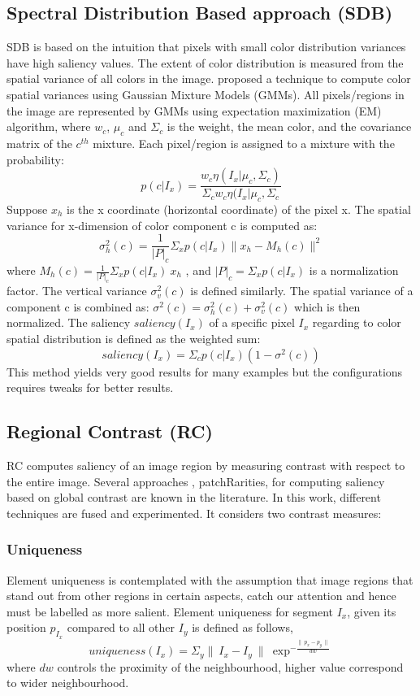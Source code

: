 \subsection{Spectral Distribution Based approach (SDB)} 
SDB is based on the intuition that pixels with small color distribution variances have high saliency values.  The extent of color distribution is measured from the spatial variance of all colors in the image.  \cite{spectralSal} proposed a technique to compute color spatial variances using Gaussian Mixture Models (GMMs).  All pixels/regions in the image are represented by GMMs using expectation maximization (EM) algorithm, where $w_{c}$, $\mu_{c}$ and $\Sigma_{c}$ is the weight, the mean color, and the covariance matrix of the $c^{th}$ mixture. Each pixel/region is assigned to a mixture with the probability:
$$p(c | I_{x}) = \frac{w_{c}\eta(I_{x}| \mu_{c},\Sigma_{c})}{\Sigma_{c}w_{c}\eta(I_{x}| \mu_{c},\Sigma_{c}} $$
Suppose $x_{h}$ is the x coordinate (horizontal coordinate) of the pixel x. The spatial variance for x-dimension of color component c is computed as:
$$\sigma_{h}^{2}(c) = \frac{1}{|P|_{c}}\Sigma_{x}	p(c | I_{x}) \parallel x_{h} -M_{h}(c) \parallel^{2}$$
where $M_{h}(c) = \frac{1}{|P|_{c}}\Sigma_{x}p(c|I_{x})~x_h$ , and $|P|_{c} = \Sigma_{x}p(c | I_{x})$ is a normalization factor.  The vertical variance $\sigma_{v}^{2}(c)$ is defined similarly.  The spatial variance of a component c is combined as: $\sigma^{2}(c) = \sigma_{h}^{2}(c) + \sigma_{v}^{2}(c)$ which is then normalized.
The saliency $saliency(I_{x})$ of a specific pixel $I_{x}$ regarding to color spatial distribution is defined as the weighted sum:
$$saliency(I_{x}) = \Sigma_{c}p(c | I_{x})(1-\sigma^{2}(c))$$
This method yields very good results for many examples but the configurations requires tweaks for better results.

\subsection{Regional Contrast (RC)}
RC computes saliency of an image region by measuring contrast with respect to the entire image. Several approaches  \citep{globContrast}, {patchRarities}, \citep{salFilters} for computing saliency based on global contrast are known in the literature.  In this work, different techniques are fused and experimented.  It considers two contrast measures:
\subsubsection{Uniqueness}
Element uniqueness is contemplated with the assumption that image regions that stand out from other regions in certain aspects, catch our attention and hence must be labelled as more salient.  Element uniqueness for segment $I_{x}$, given its position $p_{I_{x}}$ compared to all other $I_{y}$ is defined as follows,
$$uniqueness(I_{x}) = \Sigma_{y} \parallel~I_{x} -I_{y}~\parallel~\exp^{-\frac{\parallel~p_{x} - p_{y}~\parallel}{dw}}$$
where $dw$ controls the proximity of the neighbourhood, higher value correspond to wider neighbourhood.
